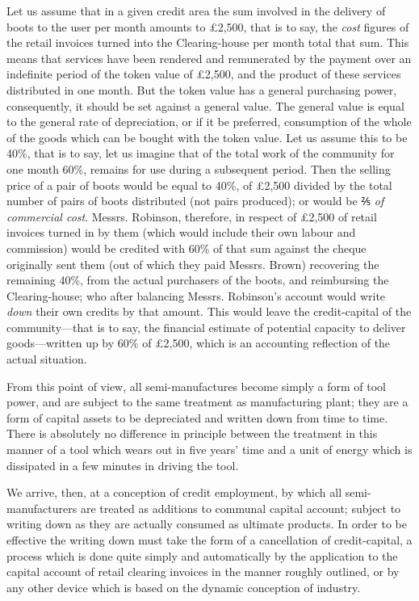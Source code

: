 \documentclass{book}
\begin{document}
Let us assume that in a given credit area the sum involved in the delivery of boots to the user per month amounts to £2,500, that is to say, the \emph{cost} figures of the retail invoices turned into the Clearing-house per month total that sum. This means that services have been rendered and remunerated by the payment over an indefinite period of the token value of £2,500, and the product of these services distributed in one month. But the token value has a general purchasing power, consequently, it should be set against a general value. The general value is equal to the general rate of depreciation, or if it be preferred, consumption of the whole of the goods which can be bought with the token value. Let us assume this to be 40\%, that is to say, let us imagine that of the total work of the community for one month 60\%, remains for use during a subsequent period. Then the selling price of a pair of boots would be equal to 40\%, of £2,500 divided by the total number of pairs of boots distributed (not pairs produced); or would be ⅖ \emph{of commercial cost}. Messrs. Robinson, therefore, in respect of £2,500 of retail invoices turned in by them (which would include their own labour and commission) would be credited with 60\% of that sum against the cheque originally sent them (out of which they paid Messrs. Brown) recovering the remaining 40\%, from the actual purchasers of the boots, and reimbursing the Clearing-house; who after balancing Messrs. Robinson’s account would write \emph{down} their own credits by that amount. This would leave the credit-capital of the community—that is to say, the financial estimate of potential capacity to deliver goods—written up by 60\% of £2,500, which is an accounting reflection of the actual situation.

From this point of view, all semi-manufactures become simply a form of tool power, and are subject to the same treatment as manufacturing plant; they are a form of capital assets to be depreciated and written down from time to time. There is absolutely no difference in principle between the treatment in this manner of a tool which wears out in five years’ time and a unit of energy which is dissipated in a few minutes in driving the tool.

We arrive, then, at a conception of credit employment, by which all semi-manufacturers are treated as additions to communal capital account; subject to writing down as they are actually consumed as ultimate products. In order to be effective the writing down must take the form of a cancellation of credit-capital, a process which is done quite simply and automatically by the application to the capital account of retail clearing invoices in the manner roughly outlined, or by any other device which is based on the dynamic conception of industry.
\end{document}
